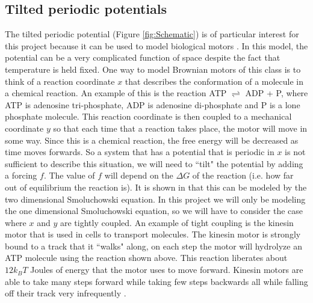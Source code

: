 \subsection{Tilted periodic potentials}
The tilted periodic potential (Figure \ref{fig:Schematic}) is of particular interest for this project because it can be used to model biological motors \cite{Leibler1993,Magnasco1994}. In this model, the potential can be a very complicated function of space despite the fact that temperature is held fixed. One way to model Brownian motors of this class is to think of a reaction coordinate $x$ that describes the conformation of a molecule in a chemical reaction. An example of this is the reaction ATP $\rightleftharpoons$ ADP + P, where ATP is adenosine tri-phosphate, ADP is adenosine di-phosphate and P is a lone phosphate molecule. This reaction coordinate is then coupled to a mechanical coordinate $y$ so that each time that a reaction takes place, the motor will move in some way. Since this is a chemical reaction, the free energy will be decreased as time moves forwards. So a system that has a potential that is periodic in $x$ is not sufficient to describe this situation, we will need to ``tilt" the potential by adding a forcing $f$. The value of $f$ will depend on the $\Delta G$ of the reaction (i.e. how far out of equilibrium the reaction is). It is shown in \cite{Magnasco1994} that this can be modeled by the two dimensional Smoluchowski equation. In this project we will only be modeling the one dimensional Smoluchowski equation, so we will have to consider the case where $x$ and $y$ are tightly coupled. An example of tight coupling is the kinesin motor \cite{Leibler1993} that is used in cells to transport molecules. The kinesin motor is strongly bound to a track that it ``walks" along, on each step the motor will hydrolyze an ATP molecule using the reaction shown above. This reaction liberates about $12 k_B T$ Joules of energy that the motor uses to move forward. Kinesin motors are able to take many steps forward while taking few steps backwards all while falling off their track very infrequently \cite{BlockSM1990}.
